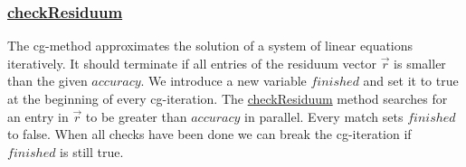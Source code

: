 \subsubsection{\hyperref[checkResiduum]{checkResiduum}}
The cg-method approximates the solution of a system of linear equations iteratively. It should terminate if all entries of the residuum vector $\vec{r}$ is smaller than the given $accuracy$. We introduce a new variable $finished$ and set it to true at the beginning of every cg-iteration. The \hyperref[checkResiduum]{checkResiduum} method searches for an entry in $\vec{r}$ to be greater than $accuracy$ in parallel. Every match sets $finished$ to false. When all checks have been done we can break the cg-iteration if $finished$ is still true.



























